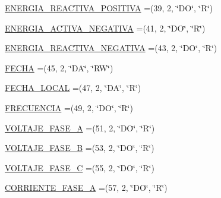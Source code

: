 \begin{DoxyCompactItemize}
\item 
\hyperlink{enumcom_1_1eneri_1_1scorpio__metertool_1_1devices_1_1_register_a1bc16f74e81bdf88b510edff58735585}{E\+N\+E\+R\+G\+I\+A\+\_\+\+R\+E\+A\+C\+T\+I\+V\+A\+\_\+\+P\+O\+S\+I\+T\+I\+VA} =(39, 2, \char`\"{}DO\char`\"{}, \char`\"{}R\char`\"{})
\item 
\hyperlink{enumcom_1_1eneri_1_1scorpio__metertool_1_1devices_1_1_register_a96b3040fa06379bccfbcc00b65b92504}{E\+N\+E\+R\+G\+I\+A\+\_\+\+A\+C\+T\+I\+V\+A\+\_\+\+N\+E\+G\+A\+T\+I\+VA} =(41, 2, \char`\"{}DO\char`\"{}, \char`\"{}R\char`\"{})
\item 
\hyperlink{enumcom_1_1eneri_1_1scorpio__metertool_1_1devices_1_1_register_ac52858a074b09401a49af3fb80f1d8db}{E\+N\+E\+R\+G\+I\+A\+\_\+\+R\+E\+A\+C\+T\+I\+V\+A\+\_\+\+N\+E\+G\+A\+T\+I\+VA} =(43, 2, \char`\"{}DO\char`\"{}, \char`\"{}R\char`\"{})
\item 
\hyperlink{enumcom_1_1eneri_1_1scorpio__metertool_1_1devices_1_1_register_a7f1131a709ef183a4405363941a563d3}{F\+E\+C\+HA} =(45, 2, \char`\"{}DA\char`\"{}, \char`\"{}RW\char`\"{})
\item 
\hyperlink{enumcom_1_1eneri_1_1scorpio__metertool_1_1devices_1_1_register_a3860786d6fc8252d4090b1d8f4766e6c}{F\+E\+C\+H\+A\+\_\+\+L\+O\+C\+AL} =(47, 2, \char`\"{}DA\char`\"{}, \char`\"{}R\char`\"{})
\item 
\hyperlink{enumcom_1_1eneri_1_1scorpio__metertool_1_1devices_1_1_register_a3f495c2c5a57a9fb9f593333f4e36a11}{F\+R\+E\+C\+U\+E\+N\+C\+IA} =(49, 2, \char`\"{}DO\char`\"{}, \char`\"{}R\char`\"{})
\item 
\hyperlink{enumcom_1_1eneri_1_1scorpio__metertool_1_1devices_1_1_register_a5e9eab9bf79e3432925ca786001f29b4}{V\+O\+L\+T\+A\+J\+E\+\_\+\+F\+A\+S\+E\+\_\+A} =(51, 2, \char`\"{}DO\char`\"{}, \char`\"{}R\char`\"{})
\item 
\hyperlink{enumcom_1_1eneri_1_1scorpio__metertool_1_1devices_1_1_register_a31ffd49ef291006916e3169dd1a2983d}{V\+O\+L\+T\+A\+J\+E\+\_\+\+F\+A\+S\+E\+\_\+B} =(53, 2, \char`\"{}DO\char`\"{}, \char`\"{}R\char`\"{})
\item 
\hyperlink{enumcom_1_1eneri_1_1scorpio__metertool_1_1devices_1_1_register_a8aede5a88bac88249de0f0b7f50a10e3}{V\+O\+L\+T\+A\+J\+E\+\_\+\+F\+A\+S\+E\+\_\+C} =(55, 2, \char`\"{}DO\char`\"{}, \char`\"{}R\char`\"{})
\item 
\hyperlink{enumcom_1_1eneri_1_1scorpio__metertool_1_1devices_1_1_register_a0f28ef2ef6c8b921cf7950a6271083a7}{C\+O\+R\+R\+I\+E\+N\+T\+E\+\_\+\+F\+A\+S\+E\+\_\+A} =(57, 2, \char`\"{}DO\char`\"{}, \char`\"{}R\char`\"{})

\end{DoxyCompactItemize}
